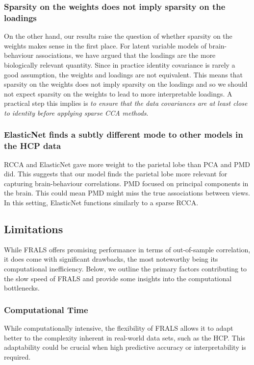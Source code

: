 \subsubsection{Sparsity on the weights does not imply sparsity on the loadings}

On the other hand, our results raise the question of whether sparsity on the weights makes sense in the first place.
For latent variable models of brain-behaviour associations, we have argued that the loadings are the more biologically relevant quantity.
Since in practice identity covariance is rarely a good assumption, the weights and loadings are not equivalent.
This means that sparsity on the weights does not imply sparsity on the loadings and so we should not expect sparsity on the weights to lead to more interpretable loadings.
A practical step this implies is \textit{to ensure that the data covariances are at least close to identity before applying sparse CCA methods}.

\subsubsection{ElasticNet finds a subtly different mode to other models in the HCP data}

RCCA and ElasticNet gave more weight to the parietal lobe than PCA and PMD did.
This suggests that our model finds the parietal lobe more relevant for capturing brain-behaviour correlations.
PMD focused on principal components in the brain.
This could mean PMD might miss the true associations between views.
In this setting, ElasticNet functions similarly to a sparse RCCA.

\subsection{Limitations}
While FRALS offers promising performance in terms of out-of-sample correlation, it does come with significant drawbacks, the most noteworthy being its computational inefficiency.
Below, we outline the primary factors contributing to the slow speed of FRALS and provide some insights into the computational bottlenecks.

\subsubsection{Computational Time}\label{subsec:computational-time}
While computationally intensive, the flexibility of FRALS allows it to adapt better to the complexity inherent in real-world data sets, such as the HCP. This adaptability could be crucial when high predictive accuracy or interpretability is required.

